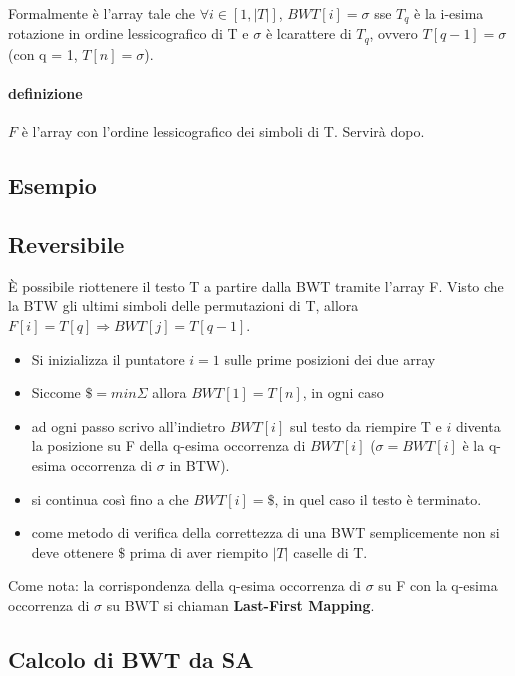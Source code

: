 Formalmente \`e l'array tale che $\forall i \in [1,|T|]$, $BWT[i] = \sigma$ sse $T_q$ \`e la i-esima rotazione in ordine lessicografico di T e $\sigma$ \`e l\ultimo carattere di $T_q$, ovvero $T[q-1] = \sigma$ (con q = 1, $T[n] = \sigma$).

\paragraph{definizione} $F$ \`e l'array con l'ordine lessicografico dei simboli di T. Servir\`a dopo.

\subsection{Esempio}


\subsection{Reversibile}

\`E possibile riottenere il testo T a partire dalla BWT tramite l'array F. Visto che la BTW gli ultimi simboli delle permutazioni di T, allora $F[i] = T[q] \Rightarrow BWT[j] = T[q-1]$.

\begin{itemize}
  \item Si inizializza il puntatore $i = 1$ sulle prime posizioni dei due array
  \item Siccome $\$ = min \Sigma$ allora $BWT[1] = T[n]$, in ogni caso
  \item ad ogni passo scrivo all'indietro $BWT[i]$ sul testo da riempire T e $i$ diventa la posizione su F della q-esima occorrenza di $BWT[i]$ ($\sigma = BWT[i]$ \`e la q-esima occorrenza di $\sigma$ in BTW).
  \item si continua cos\`i fino a che $BWT[i] = \$$, in quel caso il testo \`e terminato.
  \item come metodo di verifica della correttezza di una BWT semplicemente non si deve ottenere $\$$ prima di aver riempito $|T|$ caselle di T.
\end{itemize}

Come nota: la corrispondenza della q-esima occorrenza di $\sigma$ su F con la q-esima occorrenza di $\sigma$ su BWT si chiaman \textbf{Last-First Mapping}.

\subsection{Calcolo di BWT da SA}

